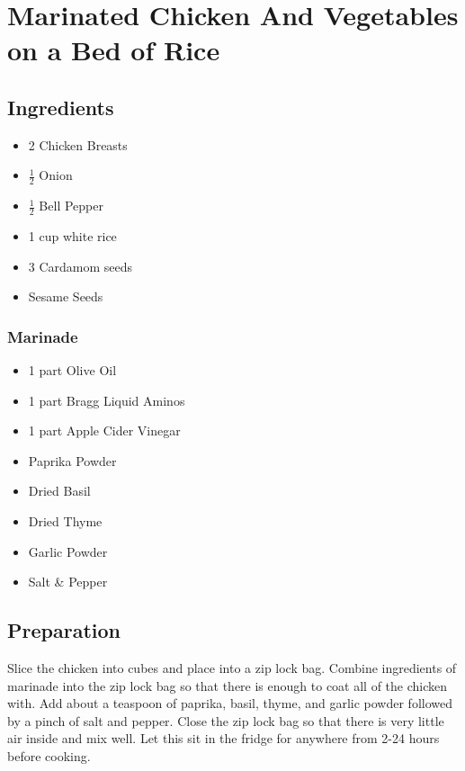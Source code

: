 \thispagestyle{fancy}
\section{Marinated Chicken And Vegetables on a Bed of Rice}
\AddToShipoutPicture*{\MarinatedChickenAndRice}

\subsection*{Ingredients}
\begin{multicols}{3}
	\begin{itemize}
		\item 2 Chicken Breasts
		\item $\frac{1}{2}$ Onion
		\item $\frac{1}{2}$ Bell Pepper 
		\item 1 cup white rice
		\item 3 Cardamom seeds
		\item Sesame Seeds
	\end{itemize}
\end{multicols}
\subsubsection*{Marinade}
\begin{multicols}{3}
	\begin{itemize}
		\item 1 part Olive Oil
		\item 1 part Bragg Liquid Aminos
		\item 1 part Apple Cider Vinegar
		\item Paprika Powder
		\item Dried Basil
		\item Dried Thyme
		\item Garlic Powder
		\item Salt \& Pepper
	\end{itemize}
\end{multicols}

\subsection*{Preparation}

Slice the chicken into cubes and place into a zip lock bag. Combine ingredients of marinade into the zip lock bag so that there is enough to coat all of the chicken with. Add about a teaspoon of paprika, basil, thyme, and garlic powder followed by a pinch of salt and pepper. Close the zip lock bag so that there is very little air inside and mix well. Let this sit in the fridge for anywhere from 2-24 hours before cooking.

